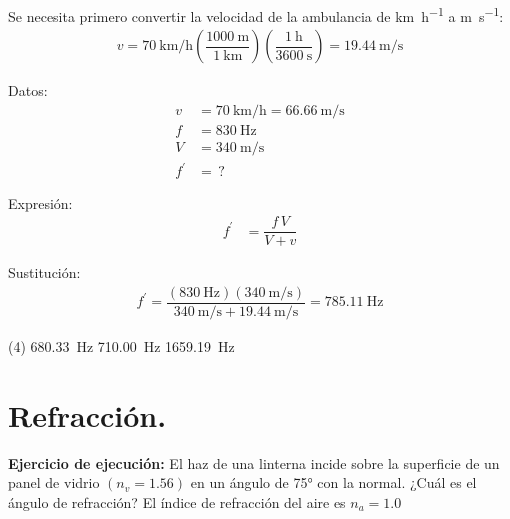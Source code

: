 \documentclass[12pt, letter]{exam}
\begin{document}
\begin{questions}
    Se necesita primero convertir la velocidad de la ambulancia de \unit{\kilo\meter\per\hour} a \unit{\meter\per\second}:
    \begin{align*}
    v = \SI[per-mode=fraction]{70}{\kilo\meter\per\hour} \left( \dfrac{\SI{1000}{\meter}}{\SI{1}{\kilo\meter}} \right) \left( \dfrac{\SI{1}{\hour}}{\SI{3600}{\second}} \right) = \SI[per-mode=fraction]{19.44}{\meter\per\second}
    \end{align*}
    
    \begin{minipage}[t]{0.35\linewidth}
    Datos: 
    \begin{align*}
    v &= \SI{70}{\kilo\meter\per\hour} = \SI{66.66}{\meter\per\second} \\
    f &= \SI{830}{\hertz} \\
    V &= \SI{340}{\meter\per\second} \\
    f^{\prime} &= \, ?
    \end{align*}
    \end{minipage}
    \hspace{1cm}
    \begin{minipage}[t]{0.4\linewidth}
    Expresión:
    \begin{align*}
    f^{\prime} &= \dfrac{f \, V}{V + v}
    \end{align*}
    \end{minipage}

    Sustitución:
    \begin{align*}
    f^{\prime} = \dfrac{\left( \SI{830}{\hertz} \right)\left( \displaystyle \SI[per-mode=fraction]{340}{\meter\per\second} \right)}{\displaystyle \SI[per-mode=fraction]{340}{\meter\per\second} + \SI[per-mode=fraction]{19.44}{\meter\per\second}} = \SI{785.11}{\hertz}
    \end{align*}

    \begin{tasks}(4)
        \task \SI{680.33}{\hertz}
        \task \SI{710.00}{\hertz}
        \task {}
        \task \SI{1659.19}{\hertz}
    \end{tasks}

    \setcounter{section}{5}

    \section{Refracción.}

    \setcounter{question}{14} \question \textbf{Ejercicio de ejecución: } El haz de una linterna incide sobre la superficie de un panel de vidrio $(n_{v} = 1.56)$ en un ángulo de \ang{75} con la normal. ¿Cuál es el ángulo de refracción? El índice de refracción del aire es $n_{a} = 1.0$
    

\end{questions}
\end{document}
